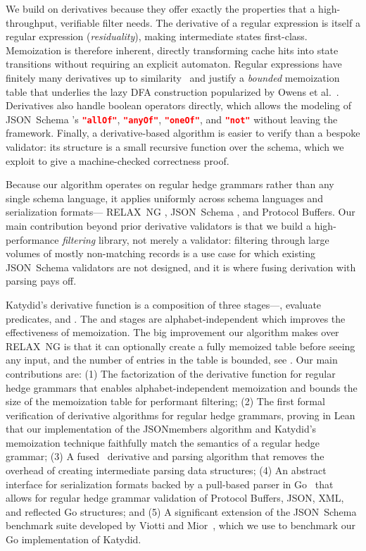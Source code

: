 \documentclass[runningheads]{llncs}
\newcommand{\enter}{\link{enter}{def enter}}
\newcommand{\leave}{\link{leave}{def leave}}
\newcommand{\RelaxNG}{%
  RELAX~NG\xspace%
}
\newcommand{\JSONSchema}{%
  JSON~Schema\xspace%
}
\newcommand{\DFA}{\ac{DFA}\xspace}
\newcommand{\JSON}{\ac{JSON}\xspace}
\newcommand{\XML}{\ac{XML}\xspace}
\begin{document}
We build on derivatives because they offer exactly the properties that a high-throughput, verifiable filter needs.
The derivative of a regular expression is itself a regular expression (\emph{residuality}), making intermediate states first-class. Memoization is therefore inherent, directly transforming cache hits into state transitions without requiring an explicit automaton.
Regular expressions have finitely many derivatives up to similarity~\cite{brzozowski1964derivatives,symbolicfinite} and justify a \emph{bounded} memoization table that underlies the lazy \DFA construction popularized by Owens et al.~\cite{reexamined}.
Derivatives also handle boolean operators directly, which allows the modeling of \JSONSchema's \lstinline[language=json]|"allOf"|, \lstinline[language=json]|"anyOf"|, \lstinline[language=json]|"oneOf"|, and \lstinline[language=json]|"not"| without leaving the framework.
Finally, a derivative-based algorithm is easier to verify than a bespoke validator: its structure is a small recursive function over the schema, which we exploit to give a machine-checked correctness proof.

Because our algorithm operates on regular hedge grammars rather than any single schema language, it applies uniformly across schema languages and serialization formats—\RelaxNG, \JSONSchema, and Protocol Buffers.
Our main contribution beyond prior derivative validators is that we build a high-performance \emph{filtering} library, not merely a validator: filtering through large volumes of mostly non-matching records is a use case for which existing \JSONSchema validators are not designed, and it is where fusing derivation with parsing pays off.

Katydid's derivative function is a composition of three stages—\enter, evaluate predicates, and \leave. The \enter and \leave stages are alphabet-independent which improves the effectiveness of memoization.
The big improvement our algorithm makes over \RelaxNG is that it can optionally create a fully memoized table before seeing any input, and the number of entries in the table is bounded, see .
Our main contributions are:
(1) The factorization of the derivative function for regular hedge grammars that enables alphabet-independent memoization and bounds the size of the memoization table for performant filtering;
(2) The first formal verification of derivative algorithms for regular hedge grammars, proving in Lean~\cite{lean4} that our implementation of the JSONmembers algorithm and Katydid's memoization technique faithfully match the semantics of a regular hedge grammar;
(3) A fused~\cite{fusion} derivative and parsing algorithm that removes the overhead of creating intermediate parsing data structures;
(4) An abstract interface for serialization formats backed by a pull-based parser in Go~\cite{golang} that allows for regular hedge grammar validation of Protocol Buffers, \JSON, \XML, and reflected Go structures; and
(5) A significant extension of the \JSONSchema benchmark suite developed by Viotti and Mior~\cite{blaze}, which we use to benchmark our Go implementation of Katydid.
\end{document}
